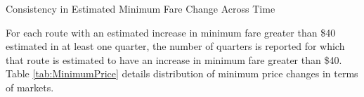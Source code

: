\documentclass{article}
\begin{document}
\begin{appendices}
    \begin{table}
        \caption{Consistency in Estimated Minimum Fare Change Across Time}
        \label{tab:Merger_ConsistencyTable}
          \vspace{-15mm}
        \begin{center}
        
        \end{center}
        \vspace{-15mm}
        \footnotesize{For each route with an estimated increase in minimum fare greater than \$40 estimated in at least one quarter, the number of quarters is reported for which that route is estimated to have an increase in minimum fare greater than \$40. Table \ref{tab:MinimumPrice} details distribution of minimum price changes in terms of markets.}
    \end{table}
    
\end{appendices}
	
\end{document}
